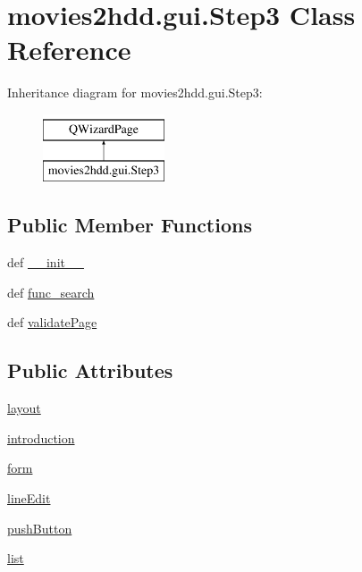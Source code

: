 \hypertarget{classmovies2hdd_1_1gui_1_1_step3}{\section{movies2hdd.\-gui.\-Step3 Class Reference}
\label{classmovies2hdd_1_1gui_1_1_step3}
}
Inheritance diagram for movies2hdd.\-gui.\-Step3\-:\begin{figure}[H]
\begin{center}
\leavevmode
\includegraphics[height=2.000000cm]{classmovies2hdd_1_1gui_1_1_step3}
\end{center}
\end{figure}
\subsection*{Public Member Functions}
\begin{DoxyCompactItemize}
\item 
def \hyperlink{classmovies2hdd_1_1gui_1_1_step3_adced9712cc906ff656705527c0b5da48}{\-\_\-\-\_\-init\-\_\-\-\_\-}
\item 
def \hyperlink{classmovies2hdd_1_1gui_1_1_step3_ae1ba8bc0179241cd53633c532f28dc25}{func\-\_\-search}
\item 
def \hyperlink{classmovies2hdd_1_1gui_1_1_step3_abd850ebfb1a7b7bb76f70ffd178f9413}{validate\-Page}
\end{DoxyCompactItemize}
\subsection*{Public Attributes}
\begin{DoxyCompactItemize}
\item 
\hyperlink{classmovies2hdd_1_1gui_1_1_step3_a219925352b4ccaef913b4530039cefd3}{layout}
\item 
\hyperlink{classmovies2hdd_1_1gui_1_1_step3_acac006717bba2aa2f5834fecf3db359f}{introduction}
\item 
\hyperlink{classmovies2hdd_1_1gui_1_1_step3_affbacc9b3831417408811bd57aa7af76}{form}
\item 
\hyperlink{classmovies2hdd_1_1gui_1_1_step3_a7d8d7669f3636fb078fa022ebc1906bd}{line\-Edit}
\item 
\hyperlink{classmovies2hdd_1_1gui_1_1_step3_a3943ef1d0f93ffd6405996b301ec47d3}{push\-Button}
\item 
\hyperlink{classmovies2hdd_1_1gui_1_1_step3_ab2215782905268ba4287fa1872f1618e}{list}
\end{DoxyCompactItemize}



